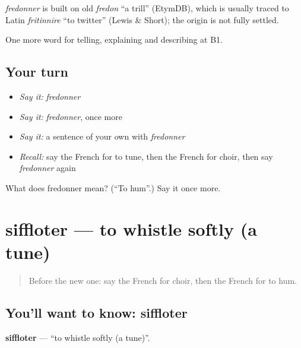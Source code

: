 \begin{cousinweb}
\emph{fredonner} is built on old \emph{fredon} \textquotedblleft{}a trill\textquotedblright{} (EtymDB), which is usually traced to Latin \emph{fritinnīre} \textquotedblleft{}to twitter\textquotedblright{} (Lewis \& Short); the origin is not fully settled.
\end{cousinweb}

\begin{grammarlens}[title={What you've built}]
One more word for telling, explaining and describing at B1.
\end{grammarlens}

\subsection*{Your turn}
\begin{itemize}
\raggedright
  \item \emph{Say it:} \emph{fredonner}
  \item \emph{Say it:} \emph{fredonner}, once more
  \item \emph{Say it:} a sentence of your own with \emph{fredonner}
  \item \emph{Recall:} say the French for to tune, then the French for choir, then say \emph{fredonner} again
\end{itemize}

\begin{tcolorbox}[breakable,colback=teal!4,colframe=teal!35!black,title={Before you move on}]
What does fredonner mean? (\textquotedblleft{}To hum\textquotedblright{}.) Say it once more.
\end{tcolorbox}
\section[siffloter]{siffloter — to whistle softly (a tune)}

\label{lesson:FR-C512-siffloter}



\begin{quote}
Before the new one: say the French for choir, then the French for to hum.
\end{quote}

\subsection*{You'll want to know: siffloter}
\textbf{siffloter} — \textquotedblleft{}to whistle softly (a tune)\textquotedblright{}.

